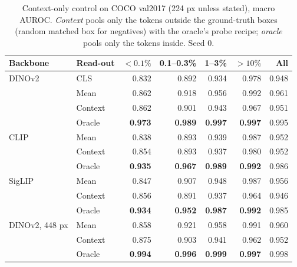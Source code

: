 \documentclass[10pt,letterpaper,twocolumn]{article}
\begin{document}
\begin{table}[t]
\centering\footnotesize\setlength{\tabcolsep}{3pt}
\caption{Context-only control on COCO val2017 (224 px unless stated), macro AUROC. \emph{Context}
pools only the tokens outside the ground-truth boxes (random matched box for negatives) with
the oracle's probe recipe; \emph{oracle} pools only the tokens inside. Seed 0.}
\label{tab:context}
\begin{tabular}{llrrrrr}
\toprule
Backbone & Read-out & $<0.1\%$ & 0.1--0.3\% & 1--3\% & $>10\%$ & All \\
\midrule
DINOv2 & CLS & 0.832 & 0.892 & 0.934 & 0.978 & 0.948 \\
       & Mean & 0.862 & 0.918 & 0.956 & 0.992 & 0.961 \\
       & Context & 0.862 & 0.901 & 0.943 & 0.967 & 0.951 \\
       & Oracle & \textbf{0.973} & \textbf{0.989} & \textbf{0.997} & \textbf{0.997} & 0.995 \\
\midrule
CLIP   & Mean & 0.838 & 0.893 & 0.939 & 0.987 & 0.952 \\
       & Context & 0.854 & 0.893 & 0.937 & 0.980 & 0.952 \\
       & Oracle & \textbf{0.935} & \textbf{0.967} & \textbf{0.989} & \textbf{0.992} & 0.986 \\
\midrule
SigLIP & Mean & 0.847 & 0.907 & 0.948 & 0.987 & 0.956 \\
       & Context & 0.856 & 0.891 & 0.937 & 0.964 & 0.946 \\
       & Oracle & \textbf{0.934} & \textbf{0.952} & \textbf{0.987} & \textbf{0.992} & 0.985 \\
\midrule
DINOv2, 448 px & Mean & 0.858 & 0.921 & 0.958 & 0.991 & 0.960 \\
       & Context & 0.875 & 0.903 & 0.941 & 0.962 & 0.952 \\
       & Oracle & \textbf{0.994} & \textbf{0.996} & \textbf{0.999} & \textbf{0.997} & 0.998 \\
\bottomrule
\end{tabular}
\end{table}
\end{document}
